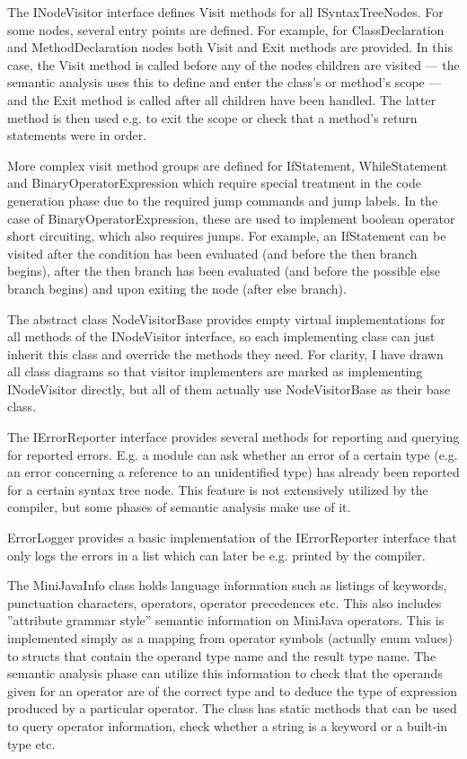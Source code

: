 \documentclass[a4paper,11pt]{article}
\begin{document}
The INodeVisitor interface defines Visit methods for all ISyntaxTreeNodes. For some nodes, several entry points are defined. For example, for ClassDeclaration and MethodDeclaration nodes both Visit and Exit methods are provided. In this case, the Visit method is called before any of the nodes children are visited --- the semantic analysis uses this to define and enter the class's or method's scope --- and the Exit method is called after all children have been handled. The latter method is then used e.g. to exit the scope or check that a method's return statements were in order.

More complex visit method groups are defined for IfStatement, WhileStatement and BinaryOperatorExpression which require special treatment in the code generation phase due to the required jump commands and jump labels. In the case of BinaryOperatorExpression, these are used to implement boolean operator short circuiting, which also requires jumps. For example, an IfStatement can be visited after the condition has been evaluated (and before the then branch begins), after the then branch has been evaluated (and before the possible else branch begins) and upon exiting the node (after else branch).

The abstract class NodeVisitorBase provides empty virtual implementations for all methods of the INodeVisitor interface, so each implementing class can just inherit this class and override the methods they need. For clarity, I have drawn all class diagrams so that visitor implementers are marked as implementing INodeVisitor directly, but all of them actually use NodeVisitorBase as their base class.

The IErrorReporter interface provides several methods for reporting and querying for reported errors. E.g. a module can ask whether an error of a certain type (e.g. an error concerning a reference to an unidentified type) has already been reported for a certain syntax tree node. This feature is not extensively utilized by the compiler, but some phases of semantic analysis make use of it.

ErrorLogger provides a basic implementation of the IErrorReporter interface that only logs the errors in a list which can later be e.g. printed by the compiler.

The MiniJavaInfo class holds language information such as listings of keywords, punctuation characters, operators, operator precedences etc. This also includes ''attribute grammar style'' semantic information on MiniJava operators. This is implemented simply as a mapping from operator symbols (actually enum values) to structs that contain the operand type name and the result type name. The semantic analysis phase can utilize this information to check that the operands given for an operator are of the correct type and to deduce the type of expression produced by a particular operator. The class has static methods that can be used to query operator information, check whether a string is a keyword or a built-in type etc.
\end{document}
